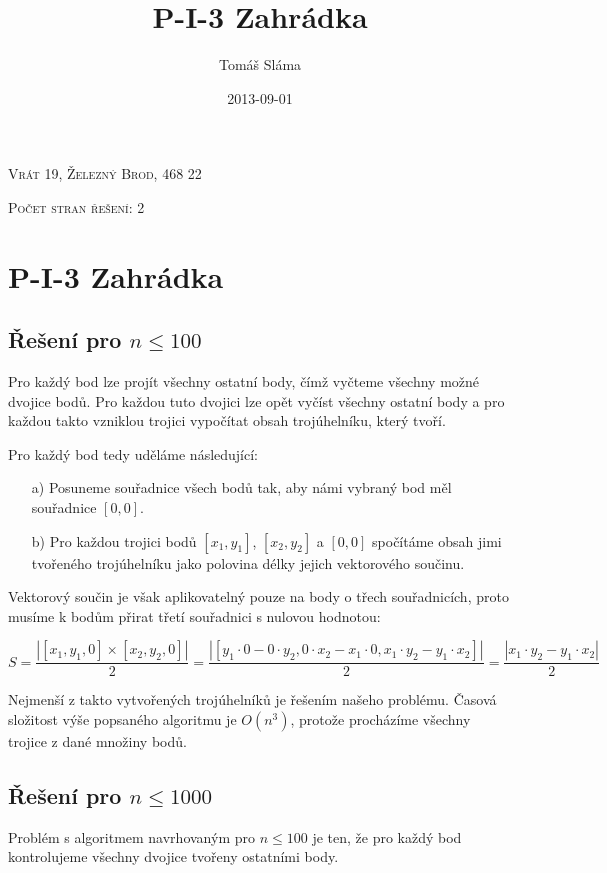 \documentclass[a4paper, 12pt]{article}
\title{P-I-3 Zahrádka}
\date{2013-09-01}
\author{Tomáš Sláma}
\date{}
\begin{document}
  \maketitle

  \bigskip
  \begin{center}
    \textsc{Vrát 19, Železný Brod, 468 22}

    \textsc{Počet stran řešení: 2}
  \end{center}

  \newpage

  \section{P-I-3 Zahrádka}

  \subsection{Řešení pro $n\le100$}
  Pro každý bod lze projít všechny ostatní body, čímž vyčteme všechny možné dvojice bodů. Pro každou tuto dvojici lze opět vyčíst všechny ostatní body a pro každou takto vzniklou trojici vypočítat obsah trojúhelníku, který tvoří.

  Pro každý bod tedy uděláme následující:
  \begin{itemize}
    \item[a)] Posuneme souřadnice všech bodů tak, aby námi vybraný bod měl souřadnice $[0,0]$.
    \item[b)] Pro každou trojici bodů $[x_1,y_1]$, $[x_2,y_2]$ a $[0,0]$ spočítáme obsah jimi tvořeného trojúhelníku jako polovina délky jejich vektorového součinu.
  \end{itemize}

  Vektorový součin je však aplikovatelný pouze na body o třech souřadnicích, proto musíme k bodům přirat třetí souřadnici s nulovou hodnotou:

  $$
  S=\frac{| [x_1,y_1,0]\times[x_2,y_2,0] |}{2}
  =\frac{| [y_1 \cdot 0 - 0 \cdot y_2, 0 \cdot x_2 - x_1 \cdot 0, x_1 \cdot y_2 - y_1 \cdot x_2] |}{2}
  =\frac{| x_1 \cdot y_2 - y_1 \cdot x_2 |}{2}
  $$

  Nejmenší z takto vytvořených trojúhelníků je řešením našeho problému. Časová složitost výše popsaného algoritmu je $O(n^3)$, protože procházíme všechny trojice z dané množiny bodů.

  \subsection{Řešení pro $n\le1000$}
  Problém s algoritmem navrhovaným pro $n\le100$ je ten, že pro každý bod kontrolujeme všechny dvojice tvořeny ostatními body.
\end{document}
